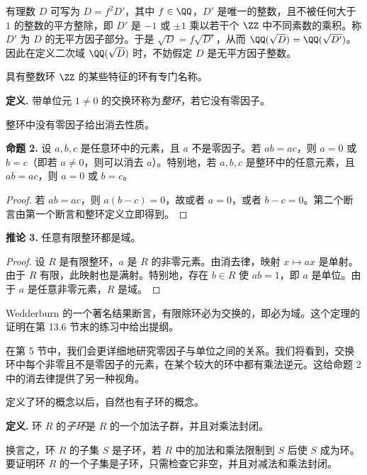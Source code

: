 \begin{enumerate}[label=(\arabic*)]
  有理数 $D$ 可写为 $D=f^2D'$，其中 $f\in\QQ$，$D'$ 是唯一的整数，且不被任何大于 $1$ 的整数的平方整除，即 $D'$ 是 $-1$ 或 $\pm1$ 乘以若干个 $\ZZ$ 中不同素数的乘积。称 $D'$ 为 $D$ 的无平方因子部分。于是 $\sqrt D=f\sqrt{D'}$，从而 $\QQ(\sqrt D)=\QQ(\sqrt{D'})$。因此在定义二次域 $\QQ(\sqrt D)$ 时，不妨假定 $D$ 是无平方因子整数。
\end{enumerate}

具有整数环 $\ZZ$ 的某些特征的环有专门名称。

\medskip
\noindent\textbf{定义.} 带单位元 $1\neq0$ 的交换环称为\emph{整环}，若它没有零因子。

整环中没有零因子给出消去性质。

\medskip
\noindent\textbf{命题 2.} 设 $a,b,c$ 是任意环中的元素，且 $a$ 不是零因子。若 $ab=ac$，则 $a=0$ 或 $b=c$（即若 $a\neq0$，则可以消去 $a$）。特别地，若 $a,b,c$ 是整环中的任意元素，且 $ab=ac$，则 $a=0$ 或 $b=c$。

\begin{proof}
若 $ab=ac$，则 $a(b-c)=0$，故或者 $a=0$，或者 $b-c=0$。第二个断言由第一个断言和整环定义立即得到。
\end{proof}

\medskip
\noindent\textbf{推论 3.} 任意有限整环都是域。

\begin{proof}
设 $R$ 是有限整环，$a$ 是 $R$ 的非零元素。由消去律，映射 $x\mapsto ax$ 是单射。由于 $R$ 有限，此映射也是满射。特别地，存在 $b\in R$ 使 $ab=1$，即 $a$ 是单位。由于 $a$ 是任意非零元素，$R$ 是域。
\end{proof}

Wedderburn 的一个著名结果断言，有限除环必为交换的，即必为域。这个定理的证明在第 13.6 节末的练习中给出提纲。

在第 5 节中，我们会更详细地研究零因子与单位之间的关系。我们将看到，交换环中每个非零且不是零因子的元素，在某个较大的环中都有乘法逆元。这给命题 2 中的消去律提供了另一种视角。

定义了环的概念以后，自然也有子环的概念。

\medskip
\noindent\textbf{定义.} 环 $R$ 的\emph{子环}是 $R$ 的一个加法子群，并且对乘法封闭。

换言之，环 $R$ 的子集 $S$ 是子环，若 $R$ 中的加法和乘法限制到 $S$ 后使 $S$ 成为环。要证明环 $R$ 的一个子集是子环，只需检查它非空，并且对减法和乘法封闭。

